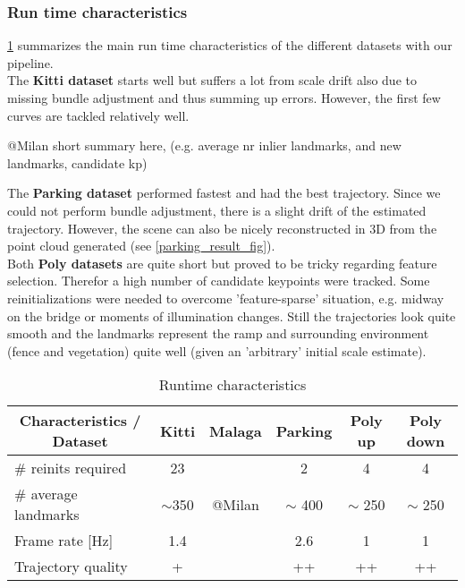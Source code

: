\subsubsection{Run time characteristics}
\cref{runtime_table} summarizes the main run time characteristics of the different datasets with our pipeline.\\

The \textbf{Kitti dataset} starts well but suffers a lot from scale drift also due to missing bundle adjustment and thus summing up errors. However, the first few curves are tackled relatively well.

\textcolor[rgb]{0,0,0}{\colorbox[rgb]{1,0,0}{@Milan short summary here, (e.g. average nr inlier landmarks, and new landmarks, candidate kp)}}

The \textbf{Parking dataset} performed fastest and had the best trajectory. Since we could not perform bundle adjustment, there is a slight drift of the estimated trajectory. However, the scene can also be nicely reconstructed in 3D from the point cloud generated (see \cref{parking_result_fig}).\\

Both \textbf{Poly datasets} are quite short but proved to be tricky regarding feature selection. Therefor a high number of candidate keypoints were tracked. Some reinitializations were needed to overcome 'feature-sparse' situation, e.g. midway on the bridge or moments of illumination changes. Still the trajectories look quite smooth and the landmarks represent the ramp and surrounding environment (fence and vegetation) quite well (given an 'arbitrary' initial scale estimate).

\begin{table}[h!!]
	\centering
	\begin{tabular}{|l|c|c|c|c|c|}
	\hline
	\multicolumn{1}{|c|}{\textbf{Characteristics / Dataset}} & \textbf{Kitti} & \textbf{Malaga} & \textbf{Parking} & \textbf{Poly up} & \textbf{Poly down} \\ \hline
	\# reinits required                                      & 23             &                 & 2                & 4 & 4  \\ \hline
	\# average landmarks                                     & $\sim$350      &  @Milan         & $\sim$ 400       & $\sim$ 250 & $\sim$ 250 \\ \hline
	Frame rate {[}Hz{]}                                      & 1.4            &                 & 2.6              & 1 & 1 \\ \hline
	Trajectory quality                                       & +              &                 & ++               & ++ & ++ \\ \hline
	\end{tabular}
	\caption{Runtime characteristics}
	\label{runtime_table}
\end{table}

